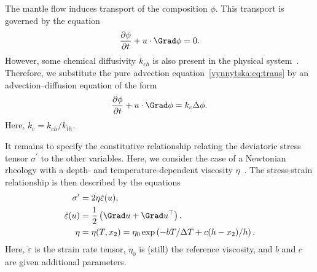 
The mantle flow induces transport of the composition $\phi$. This
transport is governed by the \nobreak equation
\begin{equation}
  \label{vynnytska:eq:trans}
  \frac{\partial \phi}{\partial t} +  u \cdot \Grad \phi = 0.
\end{equation}
However, some chemical diffusivity $k_{ch}$ is also present in the
physical system~\citep{KekenEtAl1997, HansenYuen1988}. Therefore, we
substitute the pure advection equation~\eqref{vynnytska:eq:trans} by
an advection--diffusion equation of the form
\begin{equation}
  \label{vynnytska:eq:transdif}
  \frac{\partial \phi}{\partial t}
  + u  \cdot \Grad \phi =  k_c \Delta \phi.
\end{equation}
Here, $k_c = k_{ch}/k_{th}$.

It remains to specify the constitutive relationship relating the
deviatoric stress tensor $\sigma^{\prime}$ to the other
variables. Here, we consider the case of a Newtonian rheology with a
depth- and temperature-dependent viscosity
$\eta$~\citep{BlankenbachBusse1989}. The stress-strain relationship is
then described by the equations
\begin{align}
  \sigma^{\prime} &= 2 \eta \dot{\varepsilon} (u),
\\
  \dot{\varepsilon}(u) &= \frac{1}{2} \left (\Grad u + \Grad u^{\top} \right),
\\
\label{vynnytska:eq:viscosity}
  \eta &= \eta(T, x_2) = \eta_0 \exp \left( -b T/\Delta T + c (h - x_2)/ h \right) .
\end{align}
Here, $\dot {\varepsilon}$ is the strain rate tensor, $\eta_0$ is (still)
the reference viscosity, and $b$ and $c$ are given additional parameters.

